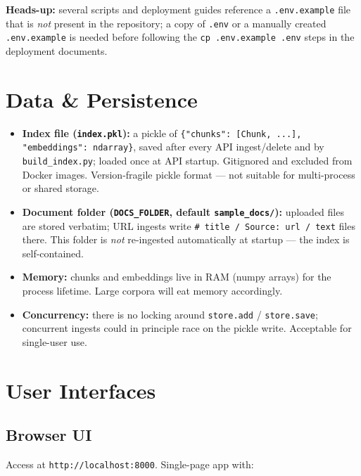 \documentclass[11pt,a4paper]{paper}
\begin{document}
\textbf{Heads-up:} several scripts and deployment guides reference a \texttt{.env.example} file that is \emph{not} present in the repository; a copy of \texttt{.env} or a manually created \texttt{.env.example} is needed before following the \texttt{cp .env.example .env} steps in the deployment documents.

\section{Data \& Persistence}
\label{sec:data}

\begin{itemize}
  \item \textbf{Index file (\texttt{index.pkl}):} a pickle of \texttt{\{"chunks": [Chunk, ...], "embeddings": ndarray\}}, saved after every API ingest/delete and by \texttt{build\_index.py}; loaded once at API startup. Gitignored and excluded from Docker images. Version-fragile pickle format — not suitable for multi-process or shared storage.
  \item \textbf{Document folder (\texttt{DOCS\_FOLDER}, default \texttt{sample\_docs/}):} uploaded files are stored verbatim; URL ingests write \texttt{\# title / Source: url / text} files there. This folder is \emph{not} re-ingested automatically at startup — the index is self-contained.
  \item \textbf{Memory:} chunks and embeddings live in RAM (numpy arrays) for the process lifetime. Large corpora will eat memory accordingly.
  \item \textbf{Concurrency:} there is no locking around \texttt{store.add} / \texttt{store.save}; concurrent ingests could in principle race on the pickle write. Acceptable for single-user use.
\end{itemize}

\section{User Interfaces}
\label{sec:ui}

\subsection{Browser UI}

Access at \texttt{http://localhost:8000}. Single-page app with:
\end{document}

